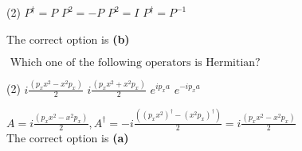 \begin{enumerate}
\begin{minipage}{\textwidth}
\end{minipage}
\begin{tasks}(2)
	\task[\textbf{A.}] $P^{\dagger}=P$
	\task[\textbf{B.}] $P^{2}=-P$
	\task[\textbf{C.}] $P^{2}=I$
	\task[\textbf{D.}]$P^{\dagger}=P^{-1}$
\end{tasks}
\begin{answer}
	The correct option is \textbf{(b)}
\end{answer}
\begin{minipage}{\textwidth}
	\item $\text { Which one of the following operators is Hermitian? }$
\end{minipage}
\begin{tasks}(2)
	\task[\textbf{A.}] $i \frac{\left(p_{x} x^{2}-x^{2} p_{x}\right)}{2}$
	\task[\textbf{B.}]$i \frac{\left(p_{x} x^{2}+x^{2} p_{x}\right)}{2}$
	\task[\textbf{C.}]$e^{i p_{x} a}$
	\task[\textbf{D.}]$e^{-i p_{x} a}$
\end{tasks}
\begin{answer}
	$A=i \frac{\left(p_{x} x^{2}-x^{2} p_{x}\right)}{2}, A^{\dagger}=-i \frac{\left(\left(p_{x} x^{2}\right)^{\dagger}-\left(x^{2} p_{x}\right)^{\dagger}\right)}{2}=i \frac{\left(p_{x} x^{2}-x^{2} p_{x}\right)}{2}$\\
	The correct option is \textbf{(a)}
\end{answer}
\end{enumerate}